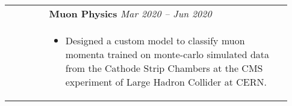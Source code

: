 \documentclass[letterpaper, 10pt, oneside]{article}
\newcommand{\bdit}[1]{{\textbf{#1}}}
\begin{document}
\begin{longtable}{@{} p{0.13\linewidth} p{0.8\linewidth}}

                         & \bdit{Muon Physics} \hfill \textsl{Mar 2020 -- Jun 2020}                                                                                                                  \\
                         & \parbox{0.8\textwidth}{                                                                                                                                                   %
        \begin{itemize}[leftmargin=*, itemsep=-0.88ex, topsep=0.2ex]
            \item Designed a custom model to classify muon momenta trained on monte-carlo simulated data from the Cathode Strip Chambers at the CMS experiment of Large Hadron Collider at CERN.
        \end{itemize}
    }                                                                                                                                                                                                \\
    \\[-1.4ex]


\end{longtable}
\end{document}
